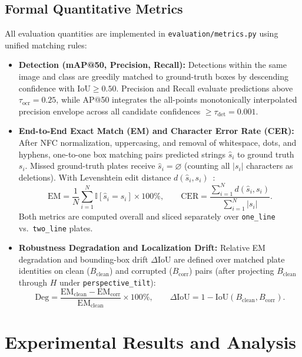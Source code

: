 \documentclass[pdflatex,sn-mathphys-num]{sn-jnl}
\begin{document}
\subsection{Formal Quantitative Metrics}\label{subsec:metrics}
All evaluation quantities are implemented in \texttt{evaluation/metrics.py} using unified matching rules:
\begin{itemize}
    \item \textbf{Detection (mAP@50, Precision, Recall):} Detections within the same image and class are greedily matched to ground-truth boxes by descending confidence with $\text{IoU} \ge 0.50$. Precision and Recall evaluate predictions above $\tau_{\text{ocr}}=0.25$, while AP@50 integrates the all-points monotonically interpolated precision envelope across all candidate confidences $\ge \tau_{\text{det}}=0.001$.
    \item \textbf{End-to-End Exact Match (EM) and Character Error Rate (CER):} After NFC normalization, uppercasing, and removal of whitespace, dots, and hyphens, one-to-one box matching pairs predicted strings $\hat{s}_i$ to ground truth $s_i$. Missed ground-truth plates receive $\hat{s}_i = \varnothing$ (counting all $|s_i|$ characters as deletions). With Levenshtein edit distance $d(\hat{s}_i, s_i)$~\cite{levenshtein1966binary}:
    \begin{equation}
        \text{EM} = \frac{1}{N}\sum_{i=1}^{N} \mathbb{I}[\hat{s}_i = s_i] \times 100\%, \qquad
        \text{CER} = \frac{\sum_{i=1}^{N} d(\hat{s}_i, s_i)}{\sum_{i=1}^{N} |s_i|}.
    \end{equation}
    Both metrics are computed overall and sliced separately over \texttt{one\_line} vs.\ \texttt{two\_line} plates.
    \item \textbf{Robustness Degradation and Localization Drift:} Relative EM degradation and bounding-box drift $\Delta\text{IoU}$ are defined over matched plate identities on clean ($B_{\text{clean}}$) and corrupted ($B_{\text{corr}}$) pairs (after projecting $B_{\text{clean}}$ through $H$ under \texttt{perspective\_tilt}):
    \begin{equation}
        \text{Deg} = \frac{\text{EM}_{\text{clean}} - \text{EM}_{\text{corr}}}{\text{EM}_{\text{clean}}} \times 100\%, \qquad
        \Delta\text{IoU} = 1 - \text{IoU}\!\left(B_{\text{clean}}, B_{\text{corr}}\right).
    \end{equation}
\end{itemize}

\section{Experimental Results and Analysis}\label{sec:results}
\end{document}
